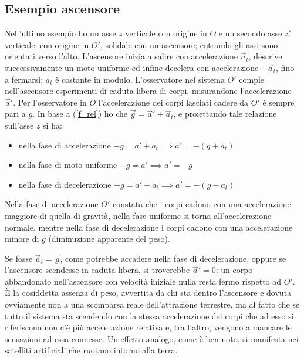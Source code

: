 \documentclass[class=book, crop=false, oneside, 12pt]{standalone}
\begin{document}
\subsection{Esempio ascensore}

Nell'ultimo esempio ho un asse \(z\) verticale con origine in \(O\) e un secondo asse \(z'\) verticale, con origine in \(O'\), solidale con un ascensore; 
entrambi gli assi sono orientati verso l'alto. 
L'ascensore inizia a salire con accelerazione \(\overrightarrow{a}_t\), descrive successivamente un moto uniforme ed infine decelera con accelerazione \(-\overrightarrow{a}_t\), fino a fermarsi; \(a_t\) è costante in modulo.
L'osservatore nel sistema \(O'\) compie nell'ascensore esperimenti di caduta libera di corpi, misurandone l'accelerazione \(\overrightarrow{a}'\).
Per l'osservatore in \(O\) l'accelerazione dei corpi lasciati cadere da \(O'\) è sempre pari a \(g\). 
In base a (\ref{f_rel}) ho che \(\overrightarrow{g} =\overrightarrow{a}'+ \overrightarrow{a}_t\), e proiettando tale relazione sull'asse \(z\) si ha:
\begin{itemize}
    \item nella fase di accelerazione \(-g = a' + a_t \implies a' = -(g + a_t)\)
    \item nella fase di moto uniforme \(-g = a' \implies a' = -g\)
    \item nella fase di decelerazione \(-g = a' - a_t \implies a' = -(g-a_t)\) 
\end{itemize}
Nella fase di accelerazione \(O'\) constata che i corpi cadono con una accelerazione maggiore di quella di gravità,
nella fase uniforme si torna all'accelerazione normale, mentre nella fase di decelerazione i corpi cadono con una accelerazione minore di \(g\) (diminuzione apparente del peso).

Se fosse \(\overrightarrow{a}_t = \overrightarrow{g}\), come potrebbe accadere nella fase di decelerazione, oppure se l'ascensore scendesse in caduta libera, si troverebbe \(\overrightarrow{a}'= 0\): 
un corpo abbandonato nell'ascensore con velocità iniziale nulla resta fermo rispetto ad \(O'\). \\
È la cosiddetta assenza di peso, avvertita da chi sta dentro l'ascensore e dovuta ovviamente non a una scomparsa reale dell'attrazione terrestre, ma al fatto che se tutto il sistema sta scendendo con la stessa accelerazione dei corpi che ad esso si riferiscono non c'è più accelerazione relativa e, tra l'altro, vengono a mancare le sensazioni ad essa connesse. 
Un effetto analogo, come è ben noto, si manifesta nei satelliti artificiali che ruotano intorno alla terra.
\end{document}
